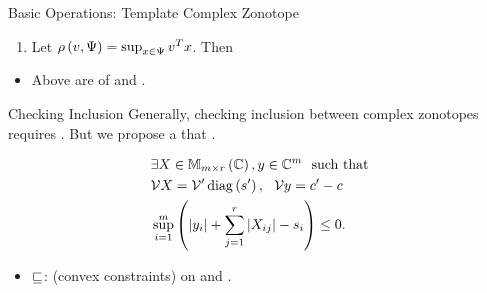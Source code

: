 %
\begin{frame}{Basic Operations: Template Complex Zonotope}
%
\begin{enumerate}
\item {\small Let $\rho\left(v,\Psi\right)=\sup_{x\in\Psi}v^Tx$}. Then \\
\eqnemph{
\[
\supp{v}{\real\lt(\tcztope{\ptemp}{\cen}{\sfact}\rt)}=v^Tc+\absolute{v^T\ptemp}\sfact.
\]
}
\end{enumerate}
%
\begin{itemize}
\item Above are  of 
and .
\end{itemize}
%
\end{frame}
%
\begin{frame}{Checking Inclusion}
Generally, checking inclusion between complex zonotopes requires .
But we propose a  that  .\\[0.5em]
%
{\small 
%
\begin{definition}[\eqnemph{$\tcztope{\ptemp^\pr}{\cen^\pr}{\sfact^\pr}\order\tcztope{\ptemp}{\cen}{\sfact}$}]
%
\vspace{-1em}
\begin{align*}
& \exists \tmat\in\mat{m}{r}{\compnums},\tvect\in\compnums^m~~\text{such
that}\\
& \ptemp\tmat=\ptemp^\pr\diagonal{\sfact^\pr},~~\ptemp\tvect=\cen^\pr-\cen~\\%
& \max_{i=1}^m\lt(\absolute{\tvect_i}+\sum_{j=1}^r\absolute{\tmat_{ij}}-\sfact_i\rt)\leq
0.
\end{align*}
%
\end{definition}
}
\vspace{0.3em}
\begin{minipage}{0.37\textwidth}
\begin{exampleblock}{}
\end{exampleblock}
\end{minipage}
%
\begin{minipage}{0.6\textwidth}
\begin{itemize}
\item $\sqsubseteq$:  (convex
constraints) on  and .
\end{itemize}
\end{minipage}
%
\end{frame}


